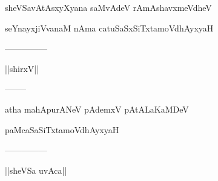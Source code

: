 \documentclass{article}
\begin{document}
\begin{center}
sheVSavAtAsxyXyana saMvAdeV rAmAshavxmeVdheV
\end{center}

\begin{center}
seYnayxjiVvanaM nAma catuSaSxSiTxtamoVdhAyxyaH
\end{center}

\begin{center}
---------------
\end{center}

\begin{center}
||shirxV||
\end{center}

\begin{center}
--------
\end{center}

\begin{center}
atha mahApurANeV pAdemxV pAtALaKaMDeV
\end{center}

\begin{center}
paMcaSaSiTxtamoVdhAyxyaH
\end{center}

\begin{center}
---------------
\end{center}

\begin{center}
||sheVSa uvAca||
\end{center}
\end{document}
